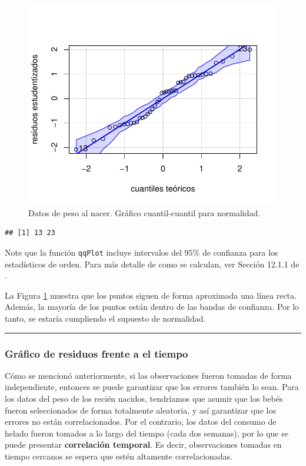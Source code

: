 \documentclass[
]{article}
\begin{document}
\begin{figure}

{\centering \includegraphics{MLG1_files/figure-latex/qqnormBWdata1-1} 

}

\caption{Datos de peso al nacer. Gráfico cuantil-cuantil para normalidad.}\label{fig:qqnormBWdata1}
\end{figure}

\begin{verbatim}
## [1] 13 23
\end{verbatim}

Note que la función \texttt{qqPlot} incluye intervalos del \(95\%\) de confianza para los estadísticos de orden. Para más detalle de como se calculan, ver Sección 12.1.1 de \citet{fox_applied_2016}.

La Figura \ref{fig:qqnormBWdata1} muestra que los puntos siguen de forma aproximada una línea recta. Además, la mayoría de los puntos están dentro de las bandas de confianza. Por lo tanto, se estaría cumpliendo el supuesto de normalidad.

\rule{\textwidth}{0.4pt}

\hypertarget{gruxe1fico-de-residuos-frente-a-el-tiempo}{%
\subsubsection{Gráfico de residuos frente a el tiempo}\label{gruxe1fico-de-residuos-frente-a-el-tiempo}}

Cómo se mencionó anteriormente, si las observaciones fueron tomadas de forma independiente, entonces se puede garantizar que los errores también lo sean. Para los datos del peso de los recién nacidos, tendríamos que asumir que los bebés fueron seleccionados de forma totalmente aleatoria, y así garantizar que los errores no están correlacionados. Por el contrario, los datos del consumo de helado fueron tomados a lo largo del tiempo (cada dos semanas), por lo que se puede presentar \textbf{correlación temporal}. Es decir, observaciones tomadas en tiempo cercanos se espera que estén altamente correlacionadas.
\end{document}
